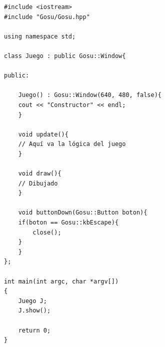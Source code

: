 \documentclass{article}
\begin{document}
\begin{lstlisting}[style=C]
#include <iostream>
#include "Gosu/Gosu.hpp"

using namespace std;

class Juego : public Gosu::Window{

public:

    Juego() : Gosu::Window(640, 480, false){
	cout << "Constructor" << endl;
    }

    void update(){
	// Aquí va la lógica del juego
    }

    void draw(){
	// Dibujado
    }

    void buttonDown(Gosu::Button boton){
	if(boton == Gosu::kbEscape){
	    close();
	}
    }
};

int main(int argc, char *argv[])
{
    Juego J;
    J.show();

    return 0;
}
\end{lstlisting}



\pagebreak
\end{document}
